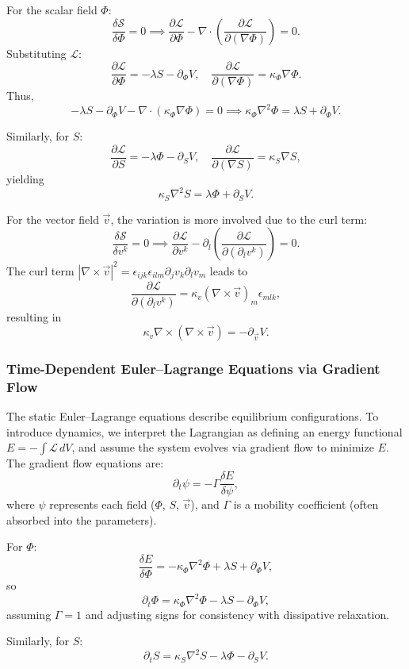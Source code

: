 \documentclass[12pt]{article}
\theoremstyle{definition}
\begin{document}
For the scalar field $\Phi$:
\[
\frac{\delta \mathcal{S}}{\delta \Phi} = 0 \implies \frac{\partial \mathcal{L}}{\partial \Phi} - \nabla \cdot \left( \frac{\partial \mathcal{L}}{\partial (\nabla \Phi)} \right) = 0.
\]
Substituting $\mathcal{L}$:
\[
\frac{\partial \mathcal{L}}{\partial \Phi} = -\lambda S - \partial_\Phi V, \quad \frac{\partial \mathcal{L}}{\partial (\nabla \Phi)} = \kappa_\Phi \nabla \Phi.
\]
Thus,
\[
-\lambda S - \partial_\Phi V - \nabla \cdot (\kappa_\Phi \nabla \Phi) = 0 \implies \kappa_\Phi \nabla^2 \Phi = \lambda S + \partial_\Phi V.
\]

Similarly, for $S$:
\[
\frac{\partial \mathcal{L}}{\partial S} = -\lambda \Phi - \partial_S V, \quad \frac{\partial \mathcal{L}}{\partial (\nabla S)} = \kappa_S \nabla S,
\]
yielding
\[
\kappa_S \nabla^2 S = \lambda \Phi + \partial_S V.
\]

For the vector field $\vec{v}$, the variation is more involved due to the curl term:
\[
\frac{\delta \mathcal{S}}{\delta v^k} = 0 \implies \frac{\partial \mathcal{L}}{\partial v^k} - \partial_l \left( \frac{\partial \mathcal{L}}{\partial (\partial_l v^k)} \right) = 0.
\]
The curl term $|\nabla \times \vec{v}|^2 = \epsilon_{ijk} \epsilon_{ilm} \partial_j v_k \partial_l v_m$ leads to
\[
\frac{\partial \mathcal{L}}{\partial (\partial_l v^k)} = \kappa_v (\nabla \times \vec{v})_m \epsilon_{mlk},
\]
resulting in
\[
\kappa_v \nabla \times (\nabla \times \vec{v}) = -\partial_{\vec{v}} V.
\]

\subsubsection{Time-Dependent Euler–Lagrange Equations via Gradient Flow}
The static Euler–Lagrange equations describe equilibrium configurations. To introduce dynamics, we interpret the Lagrangian as defining an energy functional $E = -\int \mathcal{L} \, dV$, and assume the system evolves via gradient flow to minimize $E$. The gradient flow equations are:
\[
\partial_t \psi = -\Gamma \frac{\delta E}{\delta \psi},
\]
where $\psi$ represents each field ($\Phi$, $S$, $\vec{v}$), and $\Gamma$ is a mobility coefficient (often absorbed into the parameters).

For $\Phi$:
\[
\frac{\delta E}{\delta \Phi} = -\kappa_\Phi \nabla^2 \Phi + \lambda S + \partial_\Phi V,
\]
so
\[
\partial_t \Phi = \kappa_\Phi \nabla^2 \Phi - \lambda S - \partial_\Phi V,
\]
assuming $\Gamma = 1$ and adjusting signs for consistency with dissipative relaxation.

Similarly, for $S$:
\[
\partial_t S = \kappa_S \nabla^2 S - \lambda \Phi - \partial_S V.
\]
\end{document}
